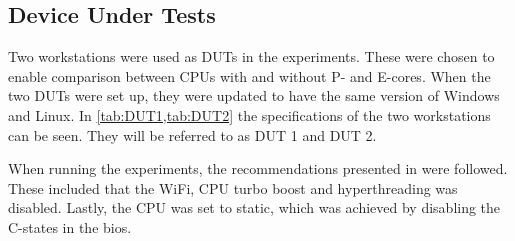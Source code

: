 \subsection{Device Under Tests}
Two workstations were used as DUTs in the experiments. These were chosen to enable comparison between CPUs with and without P- and E-cores. When the two DUTs were set up, they were updated to have the same version of Windows and Linux. In \cref {tab:DUT1,tab:DUT2} the specifications of the two workstations can be seen. They will be referred to as DUT 1 and DUT 2. 




When running the experiments, the recommendations presented in \cite{Lindholt2022} were followed. These included that the WiFi, CPU turbo boost and hyperthreading was disabled. Lastly, the CPU was set to static, which was achieved by disabling the C-states in the bios.